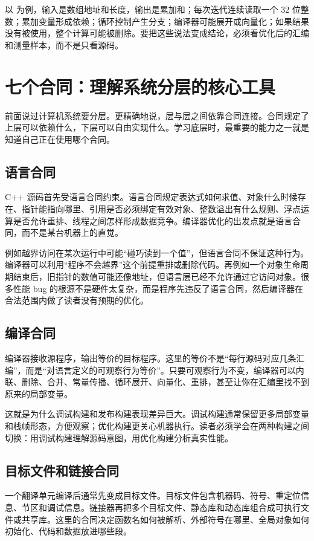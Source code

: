 以  为例，输入是数组地址和长度，输出是累加和；每次迭代连续读取一个 32 位整数；累加变量形成依赖；循环控制产生分支；编译器可能展开或向量化；如果结果没有被使用，整个计算可能被删除。要把这些说法变成结论，必须看优化后的汇编和测量样本，而不是只看源码。

\section{七个合同：理解系统分层的核心工具}

前面说过计算机系统要分层。更精确地说，层与层之间依靠合同连接。合同规定了上层可以依赖什么，下层可以自由实现什么。学习底层时，最重要的能力之一就是知道自己正在使用哪个合同。

\subsection{语言合同}

C++ 源码首先受语言合同约束。语言合同规定表达式如何求值、对象什么时候存在、指针能指向哪里、引用是否必须绑定有效对象、整数溢出有什么规则、浮点运算是否允许重排、线程之间怎样形成数据竞争。编译器优化的出发点就是语言合同，而不是某台机器上的直觉。

例如越界访问在某次运行中可能“碰巧读到一个值”，但语言合同不保证这种行为。编译器可以利用“程序不会越界”这个前提重排或删除代码。再例如一个对象生命周期结束后，旧指针的数值可能还像地址，但语言层已经不允许通过它访问对象。很多性能 bug 的根源不是硬件太复杂，而是程序先违反了语言合同，然后编译器在合法范围内做了读者没有预期的优化。

\subsection{编译合同}

编译器接收源程序，输出等价的目标程序。这里的等价不是“每行源码对应几条汇编”，而是“对语言定义的可观察行为等价”。只要可观察行为不变，编译器可以内联、删除、合并、常量传播、循环展开、向量化、重排，甚至让你在汇编里找不到原来的局部变量。

这就是为什么调试构建和发布构建表现差异巨大。调试构建通常保留更多局部变量和栈帧形态，方便观察；优化构建更关心机器执行。读者必须学会在两种构建之间切换：用调试构建理解源码意图，用优化构建分析真实性能。

\subsection{目标文件和链接合同}

一个翻译单元编译后通常先变成目标文件。目标文件包含机器码、符号、重定位信息、节区和调试信息。链接器再把多个目标文件、静态库和动态库组合成可执行文件或共享库。这里的合同决定函数名如何被解析、外部符号在哪里、全局对象如何初始化、代码和数据放进哪些段。

